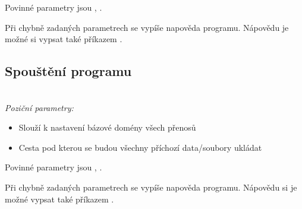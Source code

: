 Povinné parametry jsou , .

Při chybně zadaných parametrech se vypíše napověda programu. Nápovědu
je možné si vypsat také příkazem .

\subsection{Spouštění programu }

 \\

\textit{Poziční parametry:}

\begin{itemize}
    \item {} Slouží k nastavení bázové domény všech přenosů
    \item {} Cesta pod kterou se budou všechny příchozí data/soubory ukládat
\end{itemize}

Povinné parametry jsou , .

Při chybně zadaných parametrech se vypíše napověda programu. Nápovědu
si je možné vypsat také příkazem .
